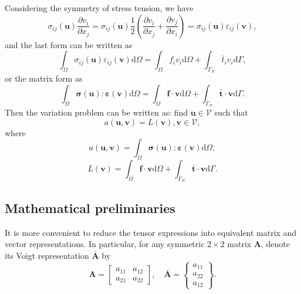 \documentclass[kulak]{kulakarticle} %
\newcommand{\ud}{\mathrm{d}}
\begin{document}
Considering the symmetry of stress tension, we have
\begin{equation}
    \sigma_{ij}(\bm{u})\frac{\partial v_i}{\partial x_j} = \sigma_{ij}(\bm{u})\frac{1}{2}\left(\frac{\partial v_i}{\partial x_j}+\frac{\partial v_j}{\partial x_i}\right)
    =\sigma_{ij}(\bm{u})\varepsilon_{ij}(\bm{v}),
\end{equation}
and the last form can be written as 
\begin{equation}
    \label{r5.s1.2.bilinear1}
    \int_\Omega\sigma_{ij}(\bm{u})\varepsilon_{ij}(\bm{v})\ud\Omega = \int_\Omega f_iv_i\ud\Omega+\int_{\Gamma_N}\bar{t}_iv_i\ud\Gamma,
\end{equation}
or the matrix form as 
\begin{equation}
    \label{r5.s1.2.bilinear2}
    \int_\Omega\bm{\sigma}(\bm{u}):\bm{\varepsilon}(\bm{v})\ud\Omega = \int_\Omega\bm{f}\cdot\bm{v}\ud\Omega+\int_{\Gamma_N}\bar{\bm{t}}\cdot\bm{v}\ud\Gamma.
\end{equation}
Then the variation problem can be written as:
find $\bm{u}\in\bm{\mathcal{V}}$ such that 
\begin{equation}
    \label{r5.s1.variationBilinear}
    a(\bm{u},\bm{v}) = L (\bm{v}),\bm{v}\in\bm{\mathcal{V}},
\end{equation}
where 
\begin{equation}
    a(\bm{u},\bm{v}) = \int_\Omega\bm{\sigma}(\bm{u}):\bm{\varepsilon}(\bm{v})\ud\Omega,
\end{equation}
\begin{equation}
    L (\bm{v}) = \int_\Omega\bm{f}\cdot\bm{v}\ud\Omega+\int_{\Gamma_N}\bar{\bm{t}}\cdot\bm{v}\ud\Gamma.
\end{equation}

\subsection{Mathematical preliminaries}
\label{r5.s1.3}
It is more convenient to reduce the tensor expressions into equivalent matrix and vector representations. 
In particular, for any symmetric $2\times 2$ matrix $\bm{A}$, denote its Voigt representation $\bar{\bm{A}}$ by 
\begin{equation}
    \bm{A} = \begin{bmatrix}
        a_{11} & a_{12} \\ a_{21} & a_{22}
    \end{bmatrix},\quad 
    \bar{\bm{A}} = \begin{Bmatrix}
        a_{11} \\ a_{22} \\ a_{12}
    \end{Bmatrix}.
\end{equation}
\end{document}
